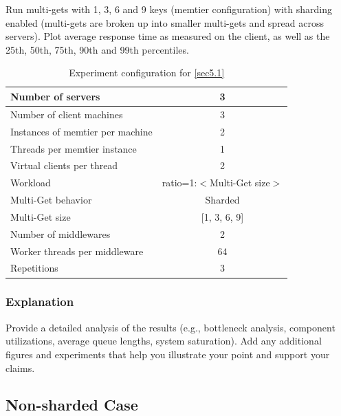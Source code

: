 \documentclass[11pt,a4paper]{article}
\begin{document}
Run multi-gets with 1, 3, 6 and 9 keys (memtier configuration) with sharding enabled (multi-gets are broken up into smaller multi-gets and spread across servers). Plot average response time as measured on the client, as well as the 25th, 50th, 75th, 90th and 99th percentiles.

\begin{center}
    \begin{table}
		\begin{tabular}{|l|c|}
			\hline Number of servers                & 3                       \\ 
			\hline Number of client machines        & 3                       \\ 
			\hline Instances of memtier per machine & 2                       \\ 
			\hline Threads per memtier instance     & 1                       \\
			\hline Virtual clients per thread       & 2     		            \\ 
			\hline Workload                         & ratio=1:$<$Multi-Get size$>$             \\
			\hline Multi-Get behavior               & Sharded                 \\
			\hline Multi-Get size                   & [1, 3, 6, 9]            \\
			\hline Number of middlewares            & 2                       \\
			\hline Worker threads per middleware    & 64                      \\
			\hline Repetitions                      & 3                       \\ 
			\hline 
		\end{tabular}
		\caption{Experiment configuration for \autoref{sec5.1}} \label{exp5-1}
	\end{table}
\end{center}

\subsubsection{Explanation}

Provide a detailed analysis of the results (e.g., bottleneck analysis, component utilizations, average queue lengths, system saturation). Add any additional figures and experiments that help you illustrate your point and support your claims.

\subsection{Non-sharded Case} \label{sec5.2}
\end{document}
